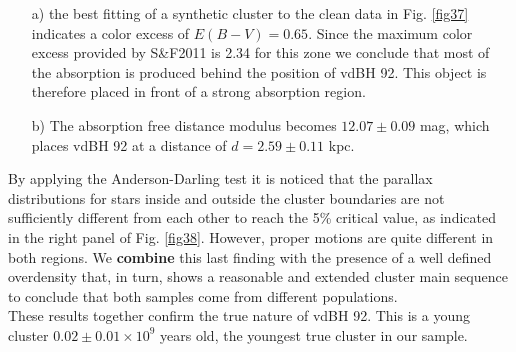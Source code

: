 \documentclass[referee]{aa}
\begin{document}
\begin{itemize}
\item [a)] the best fitting of a synthetic cluster to the clean data in Fig. 
    \ref{fig37} indicates a color excess of $E(B-V)=0.65$. Since the
    maximum color excess provided by S\&F2011 is 2.34 for this zone we
    conclude that most of the absorption is produced behind the position of
    vdBH 92. This object is therefore placed in front of a strong
    absorption region.
\item [b)] The absorption free distance modulus becomes
$12.07\pm0.09$ mag, which places vdBH 92 at a distance of $d=2.59\pm0.11$ kpc.
\end{itemize}

By applying the Anderson-Darling test it is noticed that the parallax
distributions for stars inside and outside the cluster boundaries are not
sufficiently different from each other to reach the 5\% critical value, as
indicated in the right panel of Fig. \ref{fig38}. However, proper motions are
quite different in both regions. We \textbf{combine} this last finding with the
presence of a well defined overdensity that, in turn, shows a reasonable and
extended cluster main sequence to conclude that both samples come from
different populations.\\

These results together confirm the true nature of vdBH 92. This is a
young cluster $0.02\pm0.01\times10^9$ years old, the youngest true cluster
in our sample.
\end{document}

